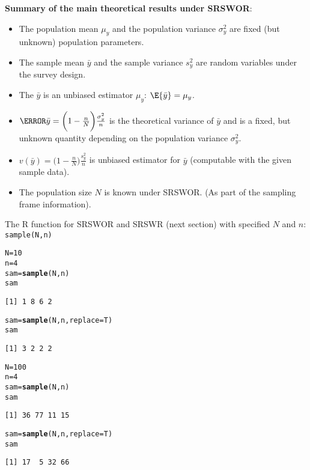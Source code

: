 \documentclass[oneside]{book}\usepackage[]{graphicx}\usepackage[svgnames]{xcolor}
\makeatletter
\newcommand{\hlnum}[1]{\textcolor[rgb]{0.686,0.059,0.569}{#1}}%
\newcommand{\hlstd}[1]{\textcolor[rgb]{0.345,0.345,0.345}{#1}}%
\newcommand{\hlkwb}[1]{\textcolor[rgb]{0.69,0.353,0.396}{#1}}%
\newcommand{\hlkwc}[1]{\textcolor[rgb]{0.333,0.667,0.333}{#1}}%
\newcommand{\hlkwd}[1]{\textcolor[rgb]{0.737,0.353,0.396}{\textbf{#1}}}%
\newenvironment{kframe}{%
 \def\at@end@of@kframe{}%
 \ifinner\ifhmode%
  \def\at@end@of@kframe{\end{minipage}}%
  \begin{minipage}{\columnwidth}%
 \fi\fi%
 \def\FrameCommand##1{\hskip\@totalleftmargin \hskip-\fboxsep
 \colorbox{shadecolor}{##1}\hskip-\fboxsep
     \hskip-\linewidth \hskip-\@totalleftmargin \hskip\columnwidth}%
 \MakeFramed {\advance\hsize-\width
   \@totalleftmargin\z@ \linewidth\hsize
   \@setminipage}}%
 {\par\unskip\endMakeFramed%
 \at@end@of@kframe}
\newenvironment{knitrout}{}{} %
\makeatother
\begin{document}
\textbf{Summary of the main theoretical results under SRSWOR}:
\begin{itemize}
      \item The population mean $ \mu_y $ and the population variance
            $ \sigma_y^2 $ are fixed (but unknown) population parameters.
      \item The sample mean $ \bar{y} $ and the sample variance $ s_y^2 $
            are random variables under the survey design.
      \item The $ \bar{y} $ is an unbiased estimator $ \mu_y $: $ \E{\bar{y}}=\mu_y $.
      \item $ \V{\bar{y}}=\biggl(1-\frac{n}{N}\biggr)\frac{\sigma_y^2}{n} $
            is the theoretical variance of $ \bar{y} $ and is a fixed, but unknown
            quantity depending on the population variance $ \sigma_y^2 $.
      \item $ v(\bar{y})=\biggl(1-\frac{n}{N}\biggr)\frac{s_y^2}{n} $
            is unbiased estimator for $ \bar{y} $ (computable with the given sample data).
      \item The population size $ N $ is known under SRSWOR\@. (As part of the sampling
            frame information).
\end{itemize}
The R function for SRSWOR and SRSWR (next section) with
specified $N$ and $n$: \texttt{sample(N,n)}
\begin{knitrout}
\color{fgcolor}\begin{kframe}
\begin{alltt}
\hlstd{N} \hlkwb{=} \hlnum{10}
\hlstd{n} \hlkwb{=} \hlnum{4}
\hlstd{sam} \hlkwb{=} \hlkwd{sample}\hlstd{(N, n)}
\hlstd{sam}
\end{alltt}
\begin{verbatim}
[1] 1 8 6 2
\end{verbatim}
\begin{alltt}
\hlstd{sam} \hlkwb{=} \hlkwd{sample}\hlstd{(N, n,} \hlkwc{replace} \hlstd{= T)}
\hlstd{sam}
\end{alltt}
\begin{verbatim}
[1] 3 2 2 2
\end{verbatim}
\begin{alltt}
\hlstd{N} \hlkwb{=} \hlnum{100}
\hlstd{n} \hlkwb{=} \hlnum{4}
\hlstd{sam} \hlkwb{=} \hlkwd{sample}\hlstd{(N, n)}
\hlstd{sam}
\end{alltt}
\begin{verbatim}
[1] 36 77 11 15
\end{verbatim}
\begin{alltt}
\hlstd{sam} \hlkwb{=} \hlkwd{sample}\hlstd{(N, n,} \hlkwc{replace} \hlstd{= T)}
\hlstd{sam}
\end{alltt}
\begin{verbatim}
[1] 17  5 32 66
\end{verbatim}
\end{kframe}
\end{knitrout}
\end{document}
